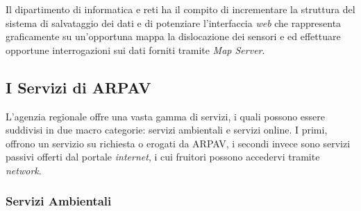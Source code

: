 Il dipartimento di informatica e reti ha il compito di incrementare la struttura del sistema di salvataggio dei dati e di potenziare l'interfaccia \textit{web} che rappresenta graficamente su un'opportuna mappa la dislocazione dei sensori e ed effettuare opportune interrogazioni sui dati forniti tramite \textit{Map Server}.

\subsection{I Servizi di ARPAV}

L'agenzia regionale offre una vasta gamma di servizi, i quali possono essere suddivisi in due macro categorie: servizi ambientali e servizi online. I primi, offrono un servizio su richiesta o erogati da ARPAV, i secondi invece sono servizi passivi offerti dal portale \textit{internet}, i cui fruitori possono accedervi tramite \textit{network}.

\subsubsection{Servizi Ambientali}

